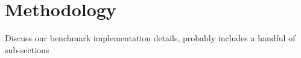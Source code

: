 \section{Methodology}
Discuss our benchmark implementation details, probably includes a handful of sub-sections
